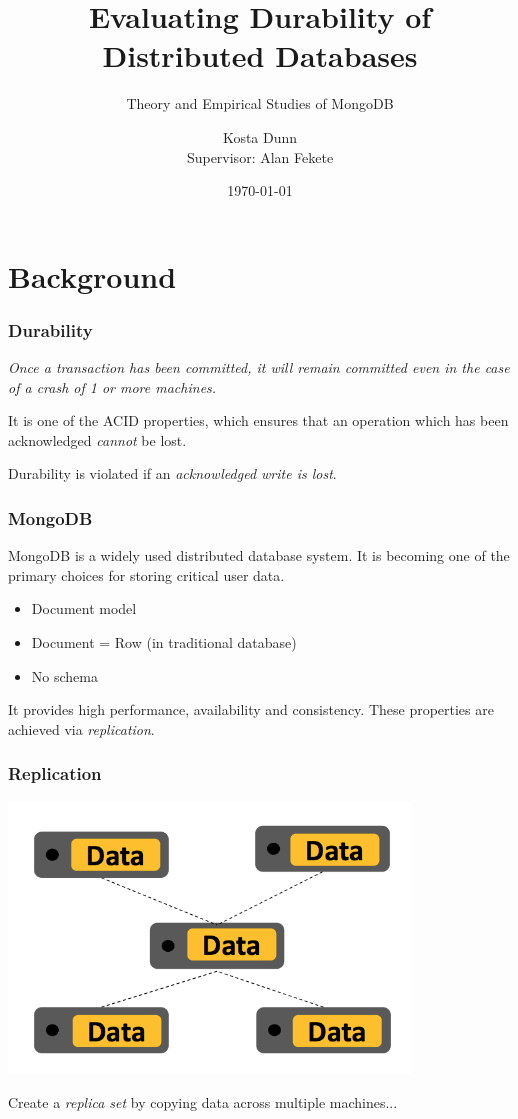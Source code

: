 \documentclass[numfooter,sectionpages,protectFrameTitle, progressbar, cblock, valigncolumns, addlogo]{beamer}
\title{Evaluating Durability of Distributed Databases}
\subtitle{Theory and Empirical Studies of MongoDB}
\date{\today}
\author{Kosta Dunn \\ Supervisor: Alan Fekete}
\begin{document}
\maketitle

\section{Background}

\begin{frame}
    \frametitle{Durability}

    \begin{center}
    \textit{Once a transaction has been committed, it will remain committed even in the case of a crash of 1 or more machines.}
    \end{center}

    It is one of the ACID properties, which ensures that an operation which has been acknowledged \textit{cannot} be lost. \citep{acid}

    Durability is violated if an \textit{acknowledged write is lost}.

\end{frame}

\begin{frame}
    \frametitle{MongoDB}

    MongoDB is a widely used distributed database system. It is becoming one of the primary choices for storing critical user data.

    \begin{itemize}
        \item Document model
        \item Document = Row (in traditional database)
        \item No schema
    \end{itemize}

    It provides high performance, availability and consistency. These properties are achieved via \textit{replication}.

\end{frame}


\begin{frame}
    \frametitle{Replication}

    \centering
    
    \includegraphics[width=0.8\textwidth]{rep1}

    Create a \textit{replica set} by copying data across multiple machines...

\end{frame}
\end{document}
